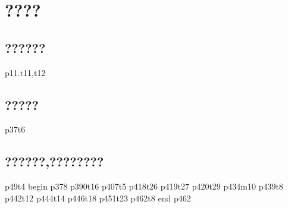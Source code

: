 \documentclass[a4paper]{ctexbook}
\begin{document}
\chapter{????}
\section{??????}
p11.t11,t12\\
\section{?????}
p37t6
\section{??????,????????}
p49t4
begin
p378
p390t16
p407t5
p418t26
p419t27
p420t29
p434m10
p439t8
p442t12
p444t14
p446t18
p451t23
p462t8
end
p462
\end{document}

